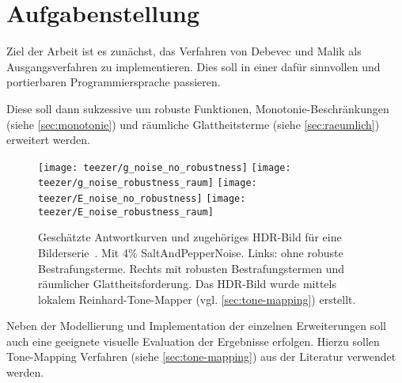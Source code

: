 \section{Aufgabenstellung}
Ziel der Arbeit ist es zunächst, das Verfahren von Debevec und Malik \cite{paper} als Ausgangsverfahren zu implementieren. Dies soll in einer dafür sinnvollen und portierbaren Programmiersprache passieren.

Diese  soll dann sukzessive um robuste Funktionen, \gls{Monotonie}-Beschränkungen (siehe \autoref{sec:monotonie}) und räumliche Glattheitsterme (siehe \autoref{sec:raeumlich}) erweitert werden.

\begin{figure}[h]
  \begin{center}
    \texttt{[image: teezer/g\_noise\_no\_robustness]}
    \texttt{[image: teezer/g\_noise\_robustness\_raum]}
    \texttt{[image: teezer/E\_noise\_no\_robustness]}
    \texttt{[image: teezer/E\_noise\_robustness\_raum]}
    \caption{Geschätzte Antwortkurven und zugehöriges HDR-Bild für eine Bilderserie~\cite{tellone}. Mit 4\% \gls{SaltAndPepperNoise}. Links: ohne robuste Bestrafungsterme. Rechts mit robusten Bestrafungstermen und räumlicher Glattheitsforderung. Das HDR-Bild wurde mittels lokalem Reinhard-Tone-Mapper (vgl. \autoref{sec:tone-mapping}) erstellt.}
    \label{fig:teezer}
  \end{center}
\end{figure}


Neben der Modellierung und Implementation der einzelnen Erweiterungen soll auch eine geeignete visuelle Evaluation der Ergebnisse erfolgen. Hierzu sollen \gls{Tone-Mapping} Verfahren (siehe \autoref{sec:tone-mapping}) aus der Literatur verwendet werden. 


